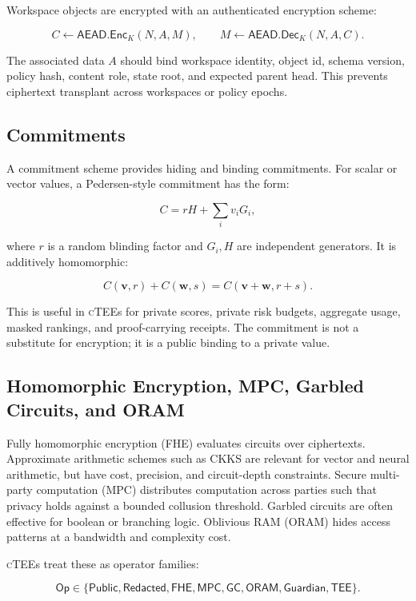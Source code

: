\documentclass[11pt]{article}
\newcommand{\ctee}{\textnormal{\textsc{cTEE}}}
\newcommand{\aead}{\ensuremath{\mathsf{AEAD}}}
\newcommand{\enc}{\ensuremath{\mathsf{Enc}}}
\newcommand{\dec}{\ensuremath{\mathsf{Dec}}}
\newcommand{\vect}[1]{\mathbf{#1}}
\begin{document}
Workspace objects are encrypted with an authenticated encryption scheme:

\[
C \leftarrow \aead.\enc_K(N, A, M),
\qquad
M \leftarrow \aead.\dec_K(N, A, C).
\]

\noindent The associated data \(A\) should bind workspace identity, object id,
schema version, policy hash, content role, state root, and expected parent
head. This prevents ciphertext transplant across workspaces or policy epochs.

\subsection{Commitments}

A commitment scheme provides hiding and binding commitments. For scalar or
vector values, a Pedersen-style commitment has the form:

\[
C = rH + \sum_i v_i G_i,
\]

\noindent where \(r\) is a random blinding factor and \(G_i,H\) are independent
generators. It is additively homomorphic:

\[
C(\vect{v}, r) + C(\vect{w}, s) =
C(\vect{v} + \vect{w}, r+s).
\]

This is useful in \ctee{}s for private scores, private risk budgets, aggregate
usage, masked rankings, and proof-carrying receipts. The commitment is not a
substitute for encryption; it is a public binding to a private value.

\subsection{Homomorphic Encryption, MPC, Garbled Circuits, and ORAM}

Fully homomorphic encryption (FHE) evaluates circuits over ciphertexts.
Approximate arithmetic schemes such as CKKS are relevant for vector and neural
arithmetic, but have cost, precision, and circuit-depth constraints. Secure
multi-party computation (MPC) distributes computation across parties such that
privacy holds against a bounded collusion threshold. Garbled circuits are often
effective for boolean or branching logic. Oblivious RAM (ORAM) hides access
patterns at a bandwidth and complexity cost.

\ctee{}s treat these as operator families:

\[
\mathsf{Op} \in
\{\mathsf{Public}, \mathsf{Redacted}, \mathsf{FHE}, \mathsf{MPC},
\mathsf{GC}, \mathsf{ORAM}, \mathsf{Guardian}, \mathsf{TEE}\}.
\]
\end{document}
